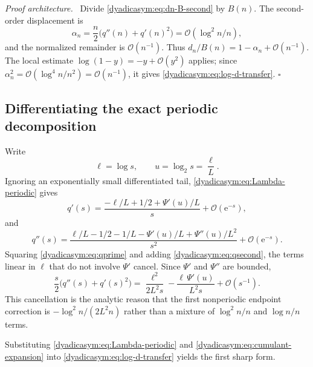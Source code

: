 \documentclass[11pt,oneside]{article}
\theoremstyle{definition}
\theoremstyle{remark}
\newcommand{\e}{\mathrm e}
\newcommand{\bigO}{\mathcal O}
\newenvironment{proofidea}{\par\smallskip\noindent\textit{Proof architecture.}\ }{\hfill$\square$\par\smallskip}
\begin{document}
\begin{proofidea}
Divide \eqref{dyadicasym:eq:dn-B-second} by $B(n)$.  The second-order displacement is
\begin{equation*}
 \alpha_n=\frac n2\bigl(q''(n)+q'(n)^2\bigr)
          =\bigO(\log^2n/n),
\end{equation*}
and the normalized remainder is $\bigO(n^{-1})$.  Thus
$d_n/B(n)=1-\alpha_n+\bigO(n^{-1})$.  The local estimate
$\log(1-y)=-y+\bigO(y^2)$ applies; since
$\alpha_n^2=\bigO(\log^4n/n^2)=\bigO(n^{-1})$, it gives
\eqref{dyadicasym:eq:log-d-transfer}.
\end{proofidea}

\subsection{Differentiating the exact periodic decomposition}

Write
\begin{equation}
 \ell=\log s,
 \qquad
 u=\log_2s=\frac\ell L.                                    \label{dyadicasym:eq:ell-u}
\end{equation}
Ignoring an exponentially small differentiated tail, \eqref{dyadicasym:eq:Lambda-periodic} gives
\begin{equation}
 q'(s)=\frac{-\ell/L+1/2+\Psi'(u)/L}{s}+\bigO(\e^{-s}),     \label{dyadicasym:eq:qprime}
\end{equation}
and
\begin{equation}
 q''(s)=\frac{\ell/L-1/2-1/L-\Psi'(u)/L+\Psi''(u)/L^2}{s^2}
 +\bigO(\e^{-s}).                                           \label{dyadicasym:eq:qsecond}
\end{equation}
Squaring \eqref{dyadicasym:eq:qprime} and adding \eqref{dyadicasym:eq:qsecond}, the terms linear in $\ell$ that do
not involve $\Psi'$ cancel.  Since $\Psi'$ and $\Psi''$ are bounded,
\begin{equation}
 \frac s2\bigl(q''(s)+q'(s)^2\bigr)
 =\frac{\ell^2}{2L^2s}-
   \frac{\ell\,\Psi'(u)}{L^2s}+\bigO(s^{-1}).              \label{dyadicasym:eq:cumulant-expansion}
\end{equation}
This cancellation is the analytic reason that the first nonperiodic endpoint correction is
$-\log^2n/(2L^2n)$ rather than a mixture of $\log^2n/n$ and $\log n/n$ terms.

Substituting \eqref{dyadicasym:eq:Lambda-periodic} and \eqref{dyadicasym:eq:cumulant-expansion} into
\eqref{dyadicasym:eq:log-d-transfer} yields the first sharp form.
\end{document}

